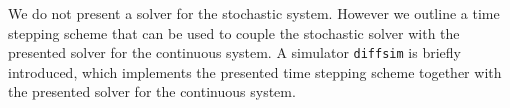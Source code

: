 We do not present a solver for the stochastic system. However we outline a time stepping scheme that can be used to couple the stochastic solver with the presented solver for the continuous system. A simulator \texttt{diffsim} is briefly introduced, which implements the presented time stepping scheme together with the presented solver for the continuous system.
%
%
%

